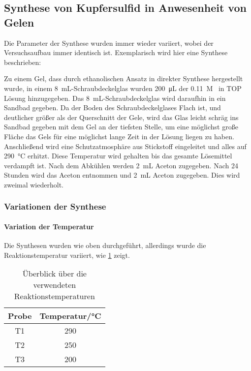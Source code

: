 	\subsection{Synthese von Kupfersulfid in Anwesenheit von Gelen}
		
			Die Parameter der Synthese wurden immer wieder variiert, wobei der Versuchsaufbau immer identisch ist.
			Exemplarisch wird hier eine Synthese beschrieben:
			
			Zu einem Gel, dass durch ethanolischen Ansatz in direkter Synthese hergestellt wurde, in einem \SI{8}{\milli\liter}-Schraubdeckelglas wurden \SI{200}{\micro\liter} der 0.11~M~ in TOP Lösung hinzugegeben.
			Das \SI{8}{\milli\liter}-Schraubdeckelglas wird daraufhin in ein Sandbad gegeben.
			Da der Boden des Schraubdeckelglases Flach ist, und deutlicher größer als der Querschnitt der Gele, wird das Glas leicht schräg ins Sandbad gegeben mit dem Gel an der tiefsten Stelle, um eine möglichst große Fläche das Gels für eine möglichst lange Zeit in der Lösung liegen zu haben.
			Anschließend wird eine Schutzatmosphäre aus Stickstoff eingeleitet und alles auf \SI{290}{\degreeCelsius} erhitzt.
			Diese Temperatur wird gehalten bis das gesamte Lösemittel verdampft ist.
			Nach dem Abkühlen werden \SI{2}{\milli\liter} Aceton zugegeben. 
			Nach 24 Stunden wird das Aceton entnommen und \SI{2}{\milli\liter} Aceton zugegeben.
			Dies wird zweimal wiederholt. 
			
			\subsubsection{Variationen der Synthese}
				
				\paragraph{Variation der Temperatur}
				\qquad\newline
					Die Synthesen wurden wie oben durchgeführt, allerdings wurde die Reaktionstemperatur variiert, wie \cref{tab:Temperatur} zeigt.
					
					\begin{table}[htbp]
						\centering
						\caption{Überblick über die verwendeten Reaktionstemperaturen}
						\label{tab:Temperatur}
						\begin{tabular}{cc}
							\toprule
							Probe & Temperatur/\si{\degreeCelsius}\\
							\midrule
							T1 & 290\\
							T2 & 250\\
							T3 & 200\\
							\bottomrule
						\end{tabular}
					\end{table}
				
